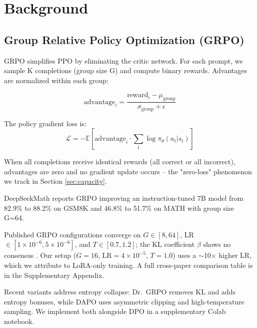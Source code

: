 \documentclass{article}
\begin{document}
\section{Background}

\subsection{Group Relative Policy Optimization (GRPO)}

GRPO \citep{shao2024deepseekmath} simplifies PPO by eliminating the critic network. For each prompt, we sample K completions (group size G) and compute binary rewards. Advantages are normalized within each group:

\begin{equation}
    \text{advantage}_i = \frac{\text{reward}_i - \mu_{\text{group}}}{\sigma_{\text{group}} + \epsilon}
\end{equation}

The policy gradient loss is:
\begin{equation}
    \mathcal{L} = -\mathbb{E}\left[\text{advantage}_i \cdot \sum_t \log \pi_\theta(a_t | s_t)\right]
\end{equation}

When all completions receive identical rewards (all correct or all incorrect), advantages are zero and no gradient update occurs -- the "zero-loss" phenomenon we track in Section \ref{sec:capacity}.

DeepSeekMath reports GRPO improving an instruction-tuned 7B model from 82.9\% to 88.2\% on GSM8K and 46.8\% to 51.7\% on MATH with group size G=64.

Published GRPO configurations converge on $G \in [8, 64]$, LR $\in [1 \times 10^{-6}, 5 \times 10^{-6}]$, and $T \in [0.7, 1.2]$; the KL coefficient $\beta$ shows no consensus \citep{deepseekr1, shao2024deepseekmath}. Our setup ($G{=}16$, LR${}=4 \times 10^{-5}$, $T{=}1.0$) uses a $\sim$10$\times$ higher LR, which we attribute to LoRA-only training. A full cross-paper comparison table is in the Supplementary Appendix.

Recent variants address entropy collapse: Dr.\ GRPO \citep{deepseekr1} removes KL and adds entropy bonuses, while DAPO \citep{yu2025dapo} uses asymmetric clipping and high-temperature sampling. We implement both alongside DPO \citep{rafailov2024dpo} in a supplementary Colab notebook.

\end{document}
